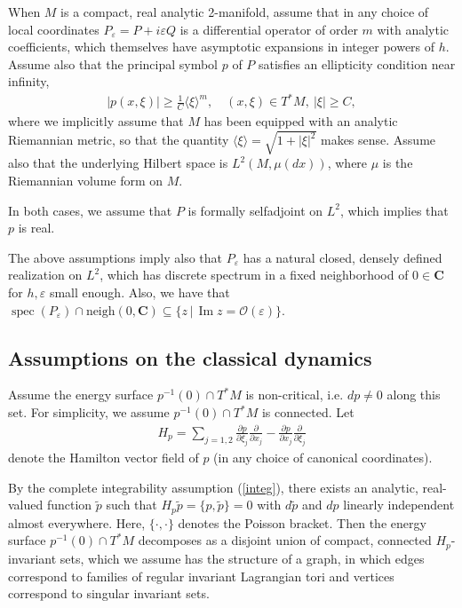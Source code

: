 \documentclass[12pt,lettersize]{article}
\DeclareMathOperator{\spec}{spec}
\DeclareMathOperator{\Imag}{Im}
\renewcommand{\epsilon}{\varepsilon}
\newcommand{\tw}{\widetilde}%
\newcommand{\st}{\,|\,}
\newcommand{\poiss}[1]{\{#1\}}
\theoremstyle{plain}%
\numberwithin{theorem}{section}
\numberwithin{equation}{section}
\theoremstyle{definition}
\theoremstyle{remark}
\begin{document}
{When $M$ is a compact, real analytic 2-manifold, assume that in any choice of local coordinates $P_\epsilon = P+i\epsilon Q$ is a differential operator of order $m$ with analytic coefficients, which themselves have asymptotic expansions in integer powers of $h$. Assume also that the principal symbol $p$ of $P$ satisfies an ellipticity condition near infinity,
%
\begin{align*}\label{}
|p(x,\xi)| \geq \frac{1}{C} \langle \xi \rangle^m, \quad (x,\xi)\in T^*M,\ |\xi| \geq C,
\end{align*} 
% 
where we implicitly assume that $M$ has been equipped with an analytic Riemannian metric, so that the quantity $\langle \xi \rangle = \sqrt{1 + |\xi|^2}$ makes sense. Assume also that the underlying Hilbert space is $L^2(M,\mu(dx))$, where $\mu$ is the Riemannian volume form on $M$.

In both cases, we assume that $P$ is formally selfadjoint on $L^2$, which implies that $p$ is real. 

The above assumptions imply also that $P_\epsilon$ has a natural closed, densely defined realization on $L^2$, which has discrete spectrum in a fixed neighborhood of $0\in \mathbf{C}$ for $h,\epsilon$ small enough. Also, we have that $\spec(P_\epsilon)\cap \mbox{neigh}(0, \mathbf{C}) \subseteq \{z \st \Imag z = \mathcal{O}(\epsilon)\}$. 

\subsection{Assumptions on the classical dynamics}\label{dyn}


Assume the energy surface $p^{-1}(0) \cap T^* M$ is non-critical, i.e. $dp \neq 0$ along this set. For simplicity, we assume $p^{-1}(0) \cap T^* M$ is connected. Let 
%
\begin{align*}{}
H_p = \sum_{j = 1,2} \frac{\partial p}{\partial \xi_j} \frac{\partial}{\partial x_j} - \frac{\partial p}{\partial x_j}\frac{\partial}{\partial \xi_j}
\end{align*}
%
denote the Hamilton vector field of $p$ (in any choice of canonical coordinates). 


By the complete integrability assumption (\ref{integ}), there exists an analytic, real-valued function $\tw p$ such that $H_p \tw p = \poiss{p,\tw p} = 0$ with $d\tw p$ and $dp$ linearly independent almost everywhere. Here, $\poiss{\cdot,\cdot}$ denotes the Poisson bracket. Then the energy surface $p^{-1}(0)\cap T^*M$ decomposes as a disjoint union of compact, connected $H_p$-invariant sets, which we assume has the structure of a graph, in which edges correspond to families of regular invariant Lagrangian tori and vertices correspond to singular invariant sets.

}
\end{document}

